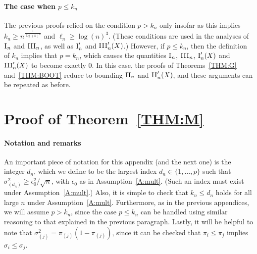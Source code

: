 \documentclass[aos,preprint]{imsart}
\numberwithin{equation}{section}
\theoremstyle{plain}
\newcommand{\I}{\textsc{I}}
\newcommand{\II}{\textsc{II}}
\newcommand{\III}{\textsc{III}}
\newcommand{\e}{\epsilon}
\newcommand{\1}{{\bf{1}}}
\newcommand{\0}{\mathbf{0}}
\begin{document}
\paragraph{The case when \lowercase{ $p\leq k_n$}}\label{lowdimcase}
The previous proofs relied on the condition $p>k_n$ only insofar as this implies $k_n\geq n^{\frac{1}{\log(n)^a}}$ and $\ell_n\geq \log(n)^3$. (These conditions are used in the analyses of $\I_n$ and $\III_n$, as well as $\I_n'$ and $\III_n'(X)$.)  However, if $p\leq k_n$, then the definition of $k_n$ implies that $p=k_n$, which causes the quantities $\I_n$, $\III_n$, $\I_n'(X)$ and $\III_n'(X)$ to become exactly 0. In this case, the proofs of Theorems~\ref{THM:G} and~\ref{THM:BOOT} reduce to bounding $\II_n$ and $\II_n'(X)$, and these arguments can be repeated as before.

%
%
%
%
%
%
%
%
%
%
%
%
%
%

\section{Proof of Theorem~\ref{THM:M}}\label{app:mult}
\paragraph{Notation and remarks}  
%
An important piece of notation for this appendix (and the next one) is the integer $d_n$, which we define to be the largest index $d_n\in\{1,\dots,p\}$ such that $\sigma_{(d_n)}^2\geq \e_0^2/\sqrt{n}$, with $\e_0$ as in Assumption~\ref{A:mult}. (Such an index must exist under Assumption~\ref{A:mult}.)
Also, it is simple to check that $k_n\leq d_n$ holds for all large $n$ under Assumption~\ref{A:mult}. Furthermore, as in the previous appendices, we will assume $p>k_n$, since the case $p\leq k_n$ can be handled using similar reasoning to that explained in the previous paragraph. Lastly, it will be helpful to note that $\sigma_{(j)}^2=\pi_{(j)}(1-\pi_{(j)})$, since it can be checked that $\pi_i\leq \pi_j$ implies $\sigma_i\leq \sigma_j$.
\end{document}
